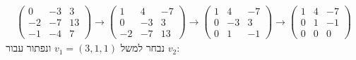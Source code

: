 \documentclass{article}
\begin{document}
\begin{align*}
    \begin{pmatrix}
        0  & -3 & 3  \\
        -2 & -7 & 13 \\
        -1 & -4 & 7
    \end{pmatrix}\rightarrow
    \begin{pmatrix}
        1  & 4  & -7 \\
        0  & -3 & 3  \\
        -2 & -7 & 13
    \end{pmatrix}\rightarrow
    \begin{pmatrix}
        1 & 4  & -7 \\
        0 & -3 & 3  \\
        0 & 1  & -1
    \end{pmatrix}\rightarrow
    \begin{pmatrix}
        1 & 4 & -7 \\
        0 & 1 & -1 \\
        0 & 0 & 0
    \end{pmatrix}
\end{align*}
נבחר למשל $v_1=(3,1,1)$ ונפתור עבור $v_2$:
\end{document}
